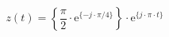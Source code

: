 \correct
\[
z(t) =  \left \{ \frac{\pi}{2} \cdot \textrm{e}^{\{ -j \cdot \pi/4 \}} \right \} \cdot \textrm{e}^{\{ j \cdot \pi \cdot t \}}
\]
